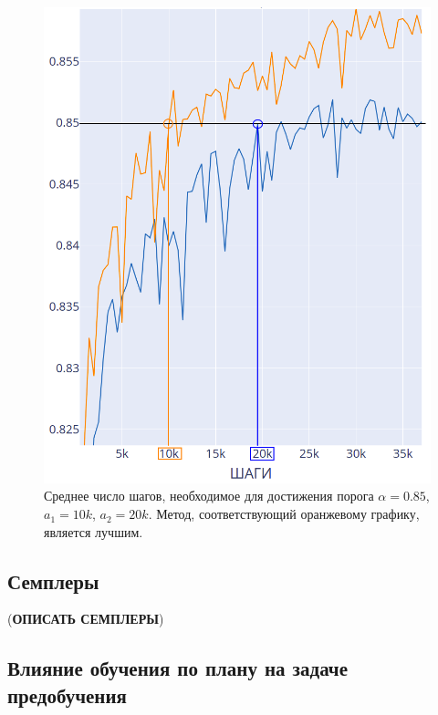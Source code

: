 \documentclass{spbau-diploma}
\begin{document}
\begin{figure}[h]
	\centering
	\includegraphics[scale=0.4]{compare}
	\caption{Среднее число шагов, необходимое для достижения порога $\alpha = 0.85$, $a_1 = 10k$, $a_2 = 20k$. Метод, соответствующий оранжевому графику, является лучшим.}
	\label{fig:metrics_compare}
\end{figure}

\subsection{Семплеры}
({\bf ОПИСАТЬ СЕМПЛЕРЫ})
\pagebreak
\subsection{Влияние обучения по плану на задаче предобучения}
\ 
\end{document}
